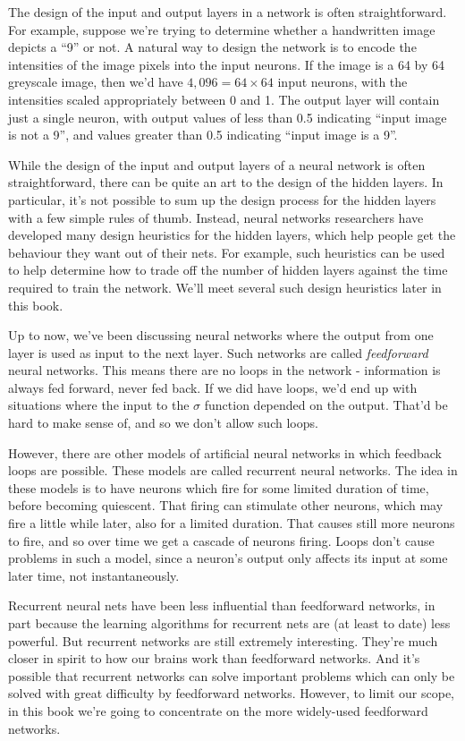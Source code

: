 \documentclass[a4paper,twoside,10pt]{book}
\begin{document}
The design of the input and output layers in a network is often straightforward. For example, suppose we're trying to determine whether a handwritten image depicts a ``9'' or not. A natural way to design the network is to encode the intensities of the image pixels into the input neurons. If the image is a 64 by 64 greyscale image, then we'd have $4,096=64\times64$ input neurons, with the intensities scaled appropriately between 0 and 1. The output layer will contain just a single neuron, with output values of less than 0.5 indicating ``input image is not a 9'', and values greater than 0.5 indicating ``input image is a 9''.

While the design of the input and output layers of a neural network is often straightforward, there can be quite an art to the design of the hidden layers. In particular, it's not possible to sum up the design process for the hidden layers with a few simple rules of thumb. Instead, neural networks researchers have developed many design heuristics for the hidden layers, which help people get the behaviour they want out of their nets. For example, such heuristics can be used to help determine how to trade off the number of hidden layers against the time required to train the network. We'll meet several such design heuristics later in this book.

Up to now, we've been discussing neural networks where the output from one layer is used as input to the next layer. Such networks are called \textit{feedforward} neural networks. This means there are no loops in the network - information is always fed forward, never fed back. If we did have loops, we'd end up with situations where the input to the $\sigma$ function depended on the output. That'd be hard to make sense of, and so we don't allow such loops.

However, there are other models of artificial neural networks in which feedback loops are possible. These models are called recurrent neural networks. The idea in these models is to have neurons which fire for some limited duration of time, before becoming quiescent. That firing can stimulate other neurons, which may fire a little while later, also for a limited duration. That causes still more neurons to fire, and so over time we get a cascade of neurons firing. Loops don't cause problems in such a model, since a neuron's output only affects its input at some later time, not instantaneously.

Recurrent neural nets have been less influential than feedforward networks, in part because the learning algorithms for recurrent nets are (at least to date) less powerful. But recurrent networks are still extremely interesting. They're much closer in spirit to how our brains work than feedforward networks. And it's possible that recurrent networks can solve important problems which can only be solved with great difficulty by feedforward networks. However, to limit our scope, in this book we're going to concentrate on the more widely-used feedforward networks.
\end{document}
